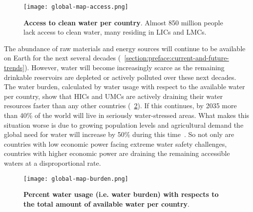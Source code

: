 \documentclass[../main/main]{subfiles}
\begin{document}
\begin{figure}[H]
	\centering
	\texttt{[image: global-map-access.png]}
	\caption[Access to clean water per country]
	{
		\textbf{Access to clean water per country}\protect\footnotemark.
		Almost 850 million people lack access to clean water, many residing in LICs and LMCs.
	}
	\label{figure:preface:global-water-access}
\end{figure}

The abundance of raw materials and energy sources will continue to be available on Earth for the next several decades (\SECTION~\ref{section:preface:current-and-future-trends}). However, water will become increasingly scarce as the remaining drinkable reservoirs are depleted or actively polluted over these next decades. The water burden, calculated by water usage with respect to the available water per country, show that HICs and UMCs are actively draining their water resources faster than any other countries  (\FIGURE~\ref{figure:preface:global-water-burden}).
If this continues, by 2035 more than 40\% of the world will live in seriously water-stressed areas. What makes this situation worse is due to growing population levels and agricultural demand the global need for water will increase by 50\% during this time~\cite{unu-inweh2017}. So not only are countries with low economic power facing extreme water safety challenges, countries with higher economic power are draining the remaining accessible waters at a disproportional rate.

\begin{figure}[H]
	\centering
	\texttt{[image: global-map-burden.png]}
	\caption[Percent water usage (i.e. water burden) with respects to the total amount of available water per country]
	{
		\textbf{Percent water usage (i.e. water burden) with respects to the total amount of available water per country}\protect\footnotemark.
	}
	\label{figure:preface:global-water-burden}
\end{figure}

\end{document}
